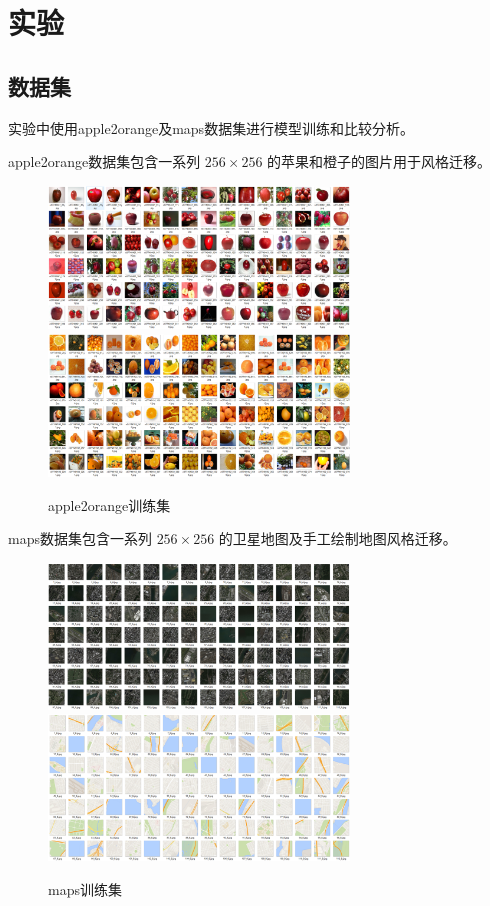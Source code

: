 \documentclass[conference]{IEEEtran}
\begin{document}
\section{实验}

\subsection{数据集}

实验中使用apple2orange及maps数据集进行模型训练和比较分析。

apple2orange数据集包含一系列 $256 \times 256$ 的苹果和橙子的图片用于风格迁移。

\begin{figure}[H]
	\centering
	\includegraphics[width=8cm]{PIC/dataSet1.PNG}
	\includegraphics[width=8cm]{PIC/dataSet2.PNG}
	\caption{apple2orange训练集}
\end{figure}

maps数据集包含一系列 $256 \times 256$ 的卫星地图及手工绘制地图风格迁移。

\begin{figure}[H]
	\centering
	\includegraphics[width=8cm]{PIC/dataSet3.PNG}
	\includegraphics[width=8cm]{PIC/dataSet4.PNG}
	\caption{maps训练集}
\end{figure}
\end{document}
